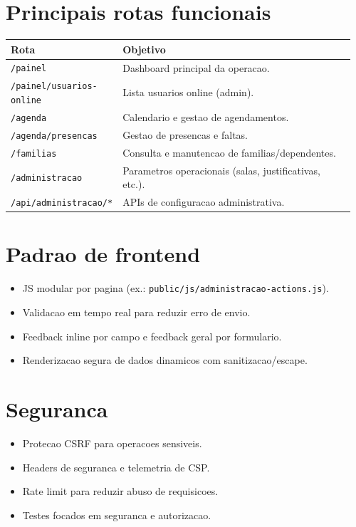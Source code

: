 \documentclass[12pt,a4paper]{article}
\begin{document}
\section{Principais rotas funcionais}
\begin{longtable}{p{0.28\linewidth} p{0.68\linewidth}}
\textbf{Rota} & \textbf{Objetivo} \\
\hline
\texttt{/painel} & Dashboard principal da operacao. \\
\texttt{/painel/usuarios-online} & Lista usuarios online (admin). \\
\texttt{/agenda} & Calendario e gestao de agendamentos. \\
\texttt{/agenda/presencas} & Gestao de presencas e faltas. \\
\texttt{/familias} & Consulta e manutencao de familias/dependentes. \\
\texttt{/administracao} & Parametros operacionais (salas, justificativas, etc.). \\
\texttt{/api/administracao/*} & APIs de configuracao administrativa. \\
\end{longtable}

\section{Padrao de frontend}
\begin{itemize}[leftmargin=*]
\item JS modular por pagina (ex.: \texttt{public/js/administracao-actions.js}).
\item Validacao em tempo real para reduzir erro de envio.
\item Feedback inline por campo e feedback geral por formulario.
\item Renderizacao segura de dados dinamicos com sanitizacao/escape.
\end{itemize}

\section{Seguranca}
\begin{itemize}[leftmargin=*]
\item Protecao CSRF para operacoes sensiveis.
\item Headers de seguranca e telemetria de CSP.
\item Rate limit para reduzir abuso de requisicoes.
\item Testes focados em seguranca e autorizacao.
\end{itemize}
\end{document}
